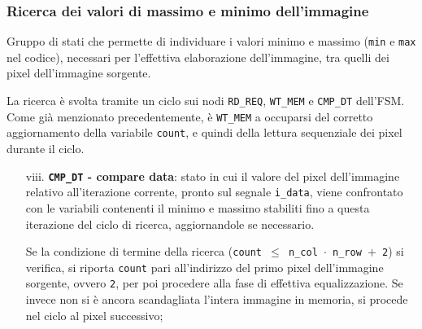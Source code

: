 \documentclass{article}
\begin{document}
\subsubsection{Ricerca dei valori di massimo e minimo dell'immagine} %
Gruppo di stati che permette di individuare i valori minimo e massimo (\texttt{min} e \texttt{max} nel codice), necessari per l’effettiva elaborazione dell’immagine, tra quelli dei pixel dell’immagine sorgente.\par
La ricerca è svolta tramite un ciclo sui nodi \texttt{RD\_REQ}, \texttt{WT\_MEM} e \texttt{CMP\_DT} dell’FSM. Come già menzionato precedentemente, è \texttt{WT\_MEM} a occuparsi del corretto aggiornamento della variabile \texttt{count}, e quindi della lettura sequenziale dei pixel durante il ciclo.
\begin{itemize}
    \item [viii.]   \textbf{\texttt{CMP\_DT} - compare data}: stato in cui il valore del pixel dell’immagine relativo all’iterazione corrente, pronto sul segnale \texttt{i\_data}, viene confrontato con le variabili contenenti il minimo e massimo stabiliti fino a questa iterazione del ciclo di ricerca, aggiornandole se necessario.\par
          Se la condizione di termine della ricerca (\texttt{count $\leq$ n\_col $\cdot$ n\_row $+$ 2}) si verifica, si riporta \texttt{count} pari all’indirizzo del primo pixel dell’immagine sorgente, ovvero \texttt{2}, per poi procedere alla fase di effettiva equalizzazione. Se invece non si è ancora scandagliata l’intera immagine in memoria, si procede nel ciclo al pixel successivo;
\end{itemize}
\end{document}
